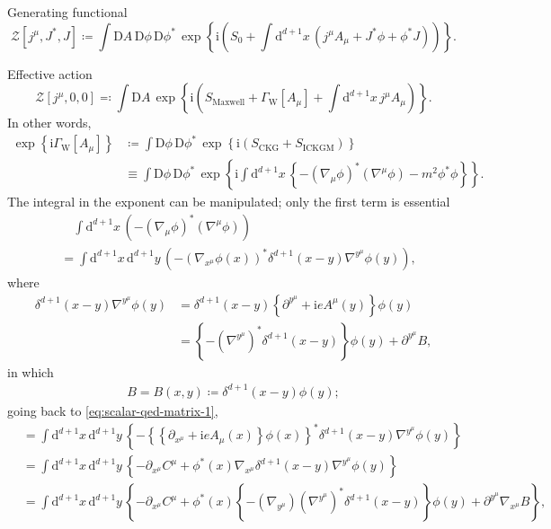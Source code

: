 \documentclass[12pt]{article}
\newcommand\mi{\mathrm{i}} %
\newcommand\dif{\mathrm{d}}
\newcommand\Dif{\mathrm{D}}
\newcommand{\rbr}[1]{{\left(#1\right)}}
\newcommand{\cbr}[1]{{\left\{#1\right\}}}
\newcommand{\rfun}[2]{{#1}\mathopen{}\left(#2\right)\mathclose{}}
\newcommand{\sfun}[2]{{#1}\mathopen{}\left[#2\right]\mathclose{}}
\newcommand{\cfun}[2]{{#1}\mathopen{}\left\{#2\right\}\mathclose{}}
\begin{document}



Generating functional
\begin{equation}
\sfun{\mathcal{Z}}{j^\mu, J^*, J} \coloneqq
\int\Dif A\,\Dif\phi\,\Dif\phi^*\,\cfun{\exp}{\mi\rbr{S_0
+\int\dif^{d+1} x\,\rbr{j^\mu A_\mu + J^* \phi+\phi^* J}}}.
\end{equation}

Effective action
\begin{equation}
\sfun{\mathcal{Z}}{j^\mu, 0, 0} \eqqcolon
\int\Dif A\,\cfun{\exp}{\mi\rbr{S_\text{Maxwell} + 
\sfun{\varGamma_\text{W}}{A_\mu}
+\int\dif^{d+1} x \,j^\mu A_\mu}}.
\end{equation}
In other words,
\begin{align}
\cfun{\exp}{\mi\sfun{\varGamma_\text{W}}{A_\mu}} &\coloneqq 
\int\Dif\phi\,\Dif\phi^*\,
\cfun{\exp}{\mi\rbr{S_\text{CKG}+S_\text{ICKGM}}}
\nonumber \\
&\equiv  \int\Dif\phi\,\Dif\phi^*\,
\cfun{\exp}{\mi\int\dif^{d+1}x\,\cbr{-\rbr{\nabla_\mu\phi}^* 
\rbr{\nabla^\mu\phi} - m^2\phi^*\phi}}.
\label{eq:scalar-qed-to-be-manipulated}
\end{align}
The integral in the exponent can be manipulated; only the first term is 
essential
\begin{align}
&\quad\int\dif^{d+1}x\,\rbr{-\rbr{\nabla_\mu\phi}^* \rbr{\nabla^\mu\phi}} 
\nonumber \\
&= \int\dif^{d+1}x\,\dif^{d+1}y\,\rbr{
-\rbr{\nabla_{x^\mu}\rfun{\phi}{x}}^* \rfun{\delta^{d+1}}{x-y}
\nabla^{y^\mu}\rfun{\phi}{y}},
\label{eq:scalar-qed-matrix-1}
\end{align}
where
\begin{align}
\rfun{\delta^{d+1}}{x-y} \nabla^{y^\mu}\rfun{\phi}{y}
&= \rfun{\delta^{d+1}}{x-y}
\cbr{\partial^{y^\mu}+\mi e \rfun{A^\mu}{y}}\rfun{\phi}{y} \nonumber \\
&= \cbr{-\rbr{\nabla^{y^\mu}}^*\rfun{\delta^{d+1}}{x-y}}\rfun{\phi}{y}
+\partial^{y^\mu}B,
\end{align}
in which
\begin{align}
B = \rfun{B}{x,y} \coloneqq \rfun{\delta^{d+1}}{x-y}\rfun{\phi}{y};
\end{align}
going back to \cref{eq:scalar-qed-matrix-1},
\begin{align}
&= \int\dif^{d+1}x\,\dif^{d+1}y\,\cbr{
-\cbr{\cbr{\partial_{x^\mu}+\mi e \rfun{A_\mu}{x}}\rfun{\phi}{x}}^* 
\rfun{\delta^{d+1}}{x-y} \nabla^{y^\mu}\rfun{\phi}{y}}
\nonumber \\
&= \int\dif^{d+1}x\,\dif^{d+1}y\,\cbr{ -\partial_{x^\mu} C^\mu + 
\rfun{\phi^*}{x}
\nabla_{x^\mu}
\rfun{\delta^{d+1}}{x-y} \nabla^{y^\mu}\rfun{\phi}{y}} \nonumber \\
&= \int\dif^{d+1}x\,\dif^{d+1}y\,\cbr{ -\partial_{x^\mu} C^\mu + 
\rfun{\phi^*}{x}
\cbr{-\rbr{\nabla_{y^\mu}}\rbr{\nabla^{y^\mu}}^*\rfun{\delta^{d+1}}{x-y}}
\rfun{\phi}{y} + \partial^{y^\mu}\nabla_{x^\mu} B},
\end{align}
\end{document}
